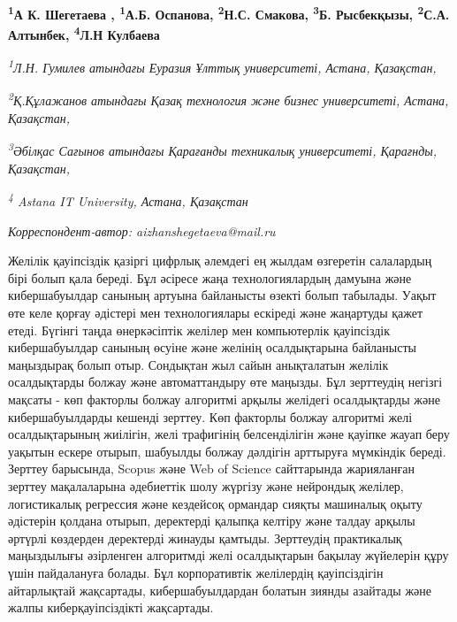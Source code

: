 
\begin{articleheader}

{\bfseries
\textsuperscript{1}А К. Шегетаева\textsuperscript{\envelope } \authorid,
\textsuperscript{1}А.Б. Оспанова\authorid,
\textsuperscript{2}Н.С. Смакова\authorid,
\textsuperscript{3}Б. Рысбекқызы\authorid,
\textsuperscript{2}С.А. Алтынбек\authorid,
\textsuperscript{4}Л.Н Кулбаева\authorid}
\end{articleheader}

\begin{affiliation}
\emph{\textsuperscript{1}Л.Н. Гумилев атындағы Еуразия Ұлттық университеті, Астана, Қазақстан,}

\emph{\textsuperscript{2}Қ.Құлажанов атындағы Қазақ технология және бизнес университеті, Астана, Қазақстан,}

\emph{\textsuperscript{3}Әбілқас Сағынов атындағы Қарағанды техникалық университеті, Қарағнды, Қазақстан,}

\emph{\textsuperscript{4} Astana IT University, Астана, Қазақстан}

\raggedright \textsuperscript{\envelope }{\em Корреспондент-автор: aizhanshegetaeva@mail.ru}
\end{affiliation}

Желілік қауіпсіздік қазіргі цифрлық әлемдегі ең жылдам өзгеретін
салалардың бірі болып қала береді. Бұл әсіресе жаңа технологиялардың
дамуына және кибершабуылдар санының артуына байланысты өзекті болып
табылады. Уақыт өте келе қорғау әдістері мен технологиялары ескіреді
және жаңартуды қажет етеді. Бүгінгі таңда өнеркәсіптік желілер мен
компьютерлік қауіпсіздік кибершабуылдар санының өсуіне және желінің
осалдықтарына байланысты маңыздырақ болып отыр. Сондықтан жыл сайын
анықталатын желілік осалдықтарды болжау және автоматтандыру өте маңызды.
Бұл зерттеудің негізгі мақсаты - көп факторлы болжау алгоритмі арқылы
желідегі осалдықтарды және кибершабуылдарды кешенді зерттеу. Көп
факторлы болжау алгоритмі желі осалдықтарының жиілігін, желі трафигінің
белсенділігін және қауіпке жауап беру уақытын ескере отырып, шабуылды
болжау дәлдігін арттыруға мүмкіндік береді. Зерттеу барысында, Scopus
және Web of Science сайттарында жарияланған зерттеу мақалаларына
әдебиеттік шолу жүргізу және нейрондық желілер, логистикалық регрессия
және кездейсоқ ормандар сияқты машиналық оқыту әдістерін қолдана отырып,
деректерді қалыпқа келтіру және талдау арқылы әртүрлі көздерден
деректерді жинауды қамтыды. Зерттеудің практикалық маңыздылығы
әзірленген алгоритмді желі осалдықтарын бақылау жүйелерін құру үшін
пайдалануға болады. Бұл корпоративтік желілердің қауіпсіздігін
айтарлықтай жақсартады, кибершабуылдардан болатын зиянды азайтады және
жалпы киберқауіпсіздікті жақсартады.

